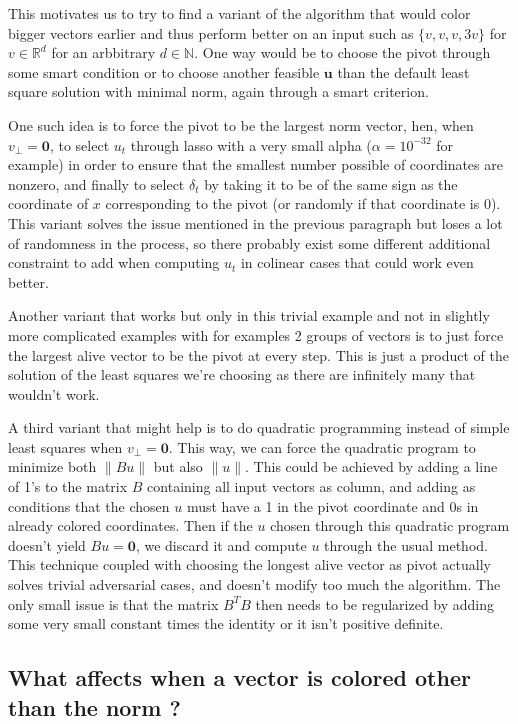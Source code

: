 \documentclass[12pt]{article}
\begin{document}
This motivates us to try to find a variant of the algorithm that would color bigger vectors earlier and thus perform better on an input such as $\{v,v,v,3v\}$ for $v\in\mathbb{R}^d$ for an arbbitrary $d\in\mathbb{N}$. One way would be to choose the pivot through some smart condition or to choose another feasible $\textbf{u}$ than the default least square solution with minimal norm, again through a smart criterion.

One such idea is to force the pivot to be the largest norm vector, hen, when $v_\perp=\textbf{0}$, to select $u_t$ through lasso with a very small alpha ($\alpha=10^{-32}$ for example) in order to ensure that the smallest number possible of coordinates are nonzero, and finally to select $\delta_t$ by taking it to be of the same sign as the coordinate of $x$ corresponding to the pivot (or randomly if that coordinate is 0). This variant solves the issue mentioned in the previous paragraph but loses a lot of randomness in the process, so there probably exist some different additional constraint to add when computing $u_t$ in colinear cases that could work even better.

Another variant that works but only in this trivial example and not in slightly more complicated examples with for examples 2 groups of vectors is to just force the largest alive vector to be the pivot at every step. This is just a product of the solution of the least squares we're choosing as there are infinitely many that wouldn't work.

A third variant that might help is to do quadratic programming instead of simple least squares when $v_\perp=\textbf{0}$. This way, we can force the quadratic program to minimize both $\|Bu\|$ but also $\|u\|$. This could be achieved by adding a line of 1's to the matrix $B$ containing all input vectors as column, and adding as conditions that the chosen $u$ must have a 1 in the pivot coordinate and 0s in already colored coordinates. Then if the $u$ chosen through this quadratic program doesn't yield $Bu=\textbf{0}$, we discard it and compute $u$ through the usual method. This technique coupled with choosing the longest alive vector as pivot actually solves trivial adversarial cases, and doesn't modify too much the algorithm. The only small issue is that the matrix $B^TB$ then needs to be regularized by adding some very small constant times the identity or it isn't positive definite.

\subsection{What affects when a vector is colored other than the norm ?}
\end{document}
